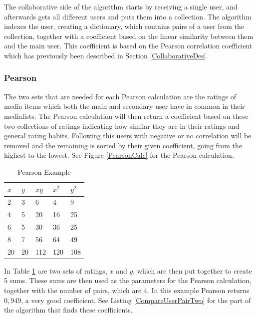 The collaborative side of the algorithm starts by receiving a single user, and afterwards gets all different users and puts them into a collection. The algorithm indexes the user, creating a dictionary, which contains pairs of a user from the collection, together with a coefficient based on the linear similarity between them and the main user. This coefficient is based on the Pearson correlation coefficient which has previously been described in Section \ref{CollaborativeDes}.

\subsubsection{Pearson}

The two sets that are needed for each Pearson calculation are the ratings of media items which both the main and secondary user have in common in their medialists. The Pearson calculation will then return a coefficient based on these two collections of ratings indicating how similar they are in their ratings and general rating habits. Following this users with negative or no correlation will be removed and the remaining is sorted by their given coefficient, going from the highest to the lowest. See Figure \ref{PearsonCalc} for the Pearson calculation.

\begin{table}[htb]
\centering
\begin{tabular}{|l|l|l|l|l|} \hline
	\textbf{$x$} & \textbf{$y$} & \textbf{$xy$}
	& \textbf{$x^2$} & \textbf{$y^2$} \\ \hline
	2 & 3 & 6 & 4 & 9 \\ \hline
	4 & 5 & 20 & 16 & 25 \\ \hline
	6 & 5 & 30 & 36 & 25 \\ \hline
	8 & 7 & 56 & 64 & 49 \\ \hline\hline
	20 & 20 & 112 & 120 & 108 \\ \hline
\end{tabular}
\caption{Pearson Example}
\label{PearsonEx}
\end{table} 

In Table \ref{PearsonEx} are two sets of ratings, $x$ and $y$, which are then put together to create 5 sums. These sums are then used as the parameters for the Pearson calculation, together with the number of pairs, which are 4. In this example Pearson returns $0,949$, a very good coefficient. See Listing \ref{CompareUserPairTwo} for the part of the algorithm that finds these coefficients.

